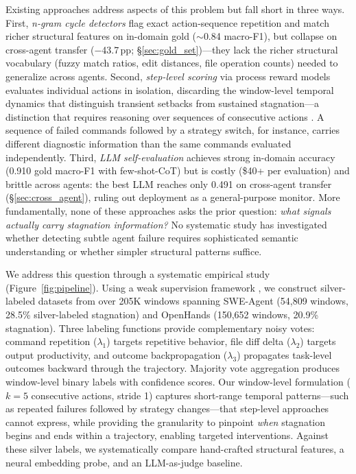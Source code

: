 Existing approaches address aspects of this problem but fall short in three ways.
First, \emph{n-gram cycle detectors} \citep{george2025cycledetection,pipis2025reasoningloop} flag exact action-sequence repetition and match richer structural features on in-domain gold (${\sim}$0.84 macro-F1), but collapse on cross-agent transfer ($-$43.7\,pp; \S\ref{sec:gold_set})---they lack the richer structural vocabulary (fuzzy match ratios, edit distances, file operation counts) needed to generalize across agents.
Second, \emph{step-level scoring} via process reward models \citep{xi2025agentprm} evaluates individual actions in isolation, discarding the window-level temporal dynamics that distinguish transient setbacks from sustained stagnation---a distinction that requires reasoning over sequences of consecutive actions \citep{chen2025monitoring}.
A sequence of failed commands followed by a strategy switch, for instance, carries different diagnostic information than the same commands evaluated independently.
Third, \emph{LLM self-evaluation} \citep{shinn2023reflexion} achieves strong in-domain accuracy (0.910 gold macro-F1 with few-shot-CoT) but is costly (\$40+ per evaluation) and brittle across agents: the best LLM reaches only 0.491 on cross-agent transfer (\S\ref{sec:cross_agent}), ruling out deployment as a general-purpose monitor.
More fundamentally, none of these approaches asks the prior question: \emph{what signals actually carry stagnation information?}
No systematic study has investigated whether detecting subtle agent failure requires sophisticated semantic understanding or whether simpler structural patterns suffice.

We address this question through a systematic empirical study (Figure~\ref{fig:pipeline}).
Using a weak supervision framework \citep{ratner2016dataprogramming,ratner2019snorkel}, we construct silver-labeled datasets from over 205K windows spanning SWE-Agent (54,809 windows, 28.5\% silver-labeled stagnation) and OpenHands (150,652 windows, 20.9\% stagnation).
Three labeling functions provide complementary noisy votes: command repetition ($\lambda_1$) targets repetitive behavior, file diff delta ($\lambda_2$) targets output productivity, and outcome backpropagation ($\lambda_3$) propagates task-level outcomes backward through the trajectory.
Majority vote aggregation produces window-level binary labels with confidence scores.
Our window-level formulation ($k{=}5$ consecutive actions, stride 1) captures short-range temporal patterns---such as repeated failures followed by strategy changes---that step-level approaches cannot express, while providing the granularity to pinpoint \emph{when} stagnation begins and ends within a trajectory, enabling targeted interventions.
Against these silver labels, we systematically compare hand-crafted structural features, a neural embedding probe, and an LLM-as-judge baseline.

